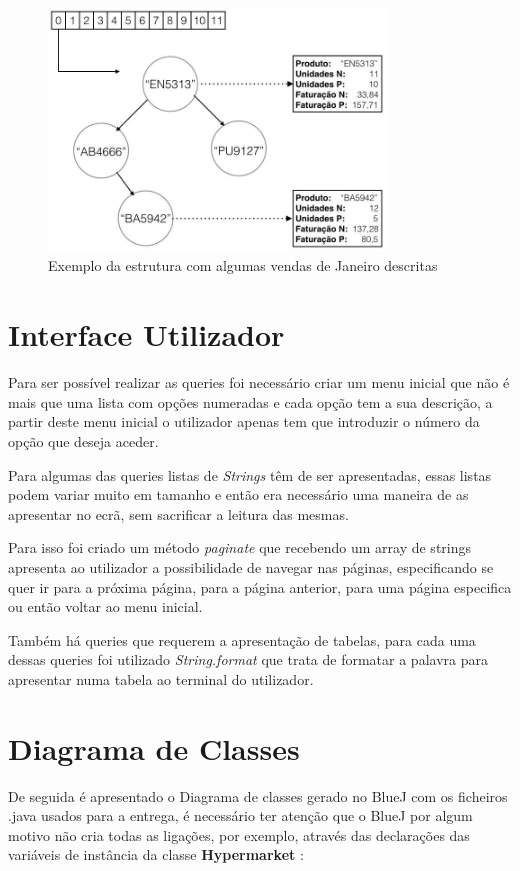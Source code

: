 \documentclass[10pt] {article}
\begin{document}
\begin{figure}[ht!]
\centering
\includegraphics[width=90mm]{accounting.jpg}
\caption{Exemplo da estrutura com algumas vendas de Janeiro descritas}
\label{fig:sales}
\end{figure}

\newpage
\section{Interface Utilizador}

Para ser possível realizar as queries foi necessário criar um menu inicial que não é mais que uma lista com opções numeradas e cada opção tem a sua descrição, a partir deste menu inicial o utilizador apenas tem que introduzir o número da opção que deseja aceder.

Para algumas das queries listas de \emph{Strings} têm de ser apresentadas, essas listas podem variar muito  em tamanho e então era necessário uma maneira de as apresentar no ecrã, sem sacrificar a leitura das mesmas.

Para isso foi criado um método \emph{paginate} que recebendo um array de strings apresenta ao utilizador a possibilidade de navegar nas páginas, especificando se quer ir para a próxima página, para a página anterior, para uma página especifica ou então voltar ao menu inicial.

Também há queries que requerem a apresentação de tabelas, para cada uma dessas queries foi utilizado \emph{String.format} que trata de formatar a palavra para apresentar numa tabela ao terminal do utilizador.
\newpage
\section{Diagrama de Classes}
\par De seguida é apresentado o Diagrama de classes gerado no BlueJ com os ficheiros .java usados para a entrega, é
necessário ter atenção que o BlueJ por algum motivo não cria todas as ligações, por exemplo, através das declarações das
variáveis de instância da classe \color{blue} \textbf{Hypermarket} \color{black}:
\end{document}
